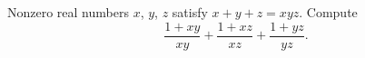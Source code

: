 Nonzero real numbers $x$, $y$, $z$ satisfy $x+y+z=xyz$. Compute
\[
\dfrac{1+xy}{xy}+\dfrac{1+xz}{xz}+\dfrac{1+yz}{yz}.
\]
